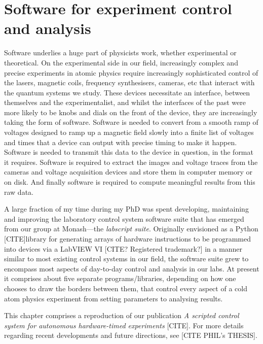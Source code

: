 \chapter{Software for experiment control and analysis}\label{chap:software}

Software underlies a huge part of physicists work, whether experimental or theoretical. On the experimental side in our field, increasingly complex and precise experiments in atomic physics require increasingly sophisticated control of the lasers, magnetic coils, frequency synthesisers, cameras, etc that interact with the quantum systems we study. These devices necessitate an interface, between themselves and the experimentalist, and whilst the interfaces of the past were more likely to be knobs and dials on the front of the device, they are increasingly taking the form of software. Software is needed to convert from a smooth ramp of voltages designed to ramp up a magnetic field slowly into a finite list of voltages and times that a device can output with precise timing to make it happen. Software is needed to transmit this data to the device in question, in the format it requires. Software is required to extract the images and voltage traces from the cameras and voltage acquisition devices and store them in computer memory or on disk. And finally software is required to compute meaningful results from this raw data.

A large fraction of my time during my PhD was spent developing, maintaining and improving the laboratory control system software suite that has emerged from our group at Monash---the \emph{labscript suite}. Originally envisioned as a Python [CITE]library for generating arrays of hardware instructions to be programmed into devices via a LabVIEW VI [CITE? Registered trademark?] in a manner similar to most existing control systems in our field, the software suite grew to encompass most aspects of day-to-day control and analysis in our labs. At present it comprises about five separate programs/libraries, depending on how one chooses to draw the borders between them, that control every aspect of a cold atom physics experiment from setting parameters to analysing results.

This chapter comprises a reproduction of our publication \emph{A scripted control system for autonomous hardware-timed experiments} [CITE]. For more details regarding recent developments and future directions, see [CITE PHIL's THESIS].


